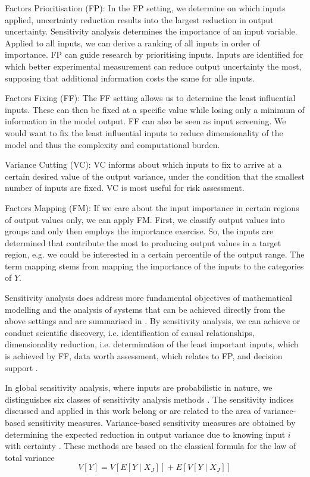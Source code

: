 Factors Prioritisation (FP): In the FP setting, we determine on which inputs applied, uncertainty reduction results into the largest reduction in output uncertainty. Sensitivity analysis determines the importance of an input variable. Applied to all inputs, we can derive a ranking of all inputs in order of importance. FP can guide research by prioritising inputs. Inputs are identified for which better experimental measurement can reduce output uncertainty the most, supposing that additional information costs the same for alle inputs.

Factors Fixing (FF): The FF setting allows us to determine the least influential inputs. These can then be fixed at a specific value while losing only a minimum of information in the model output. FF can also be seen as input screening. We would want to fix the least influential inputs to reduce dimensionality of the model and thus the complexity and computational burden.

Variance Cutting (VC): VC informs about which inputs to fix to arrive at a certain desired value of the output variance, under the condition that the smallest number of inputs are fixed. VC is most useful for risk assessment.

Factors Mapping (FM): If we care about the input importance in certain regions of output values only, we can apply FM. First, we classify output values into groups and only then employs the importance exercise. So, the inputs are determined that contribute the most to producing output values in a target region, e.g. we could be interested in a certain percentile of the output range. The term mapping stems from mapping the importance of the inputs to the categories of $Y$.

Sensitivity analysis does address more fundamental objectives of mathematical modelling and the analysis of systems that can be achieved directly from the above settings and are summarised in \citet{R21}. By sensitivity analysis, we can achieve or conduct scientific discovery, i.e. identification of causal relationships, dimensionality reduction, i.e. determination of the least important inputs, which is achieved by FF, data worth assessment, which relates to FP, and decision support \citep{R21}.

In global sensitivity analysis, where inputs are probabilistic in nature, we distinguishes six classes of sensitivity analysis methods \citep{BP16}. The sensitivity indices discussed and applied in this work belong or are related to the area of variance-based sensitivity measures. Variance-based sensitivity measures are obtained by determining the expected reduction in output variance due to knowing input $i$ with certainty \citep{BP16}. These methods are based on the classical formula for the law of total variance
\begin{equation*}
V[Y]= V[E[Y \mid X_J]] + E[V[Y \mid X_J]]
\end{equation*}

